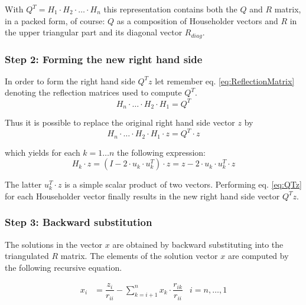 With $Q^T = H_1 \cdot H_2 \cdot \ldots \cdot H_n$ this representation
contains both the $Q$ and $R$ matrix, in a packed form, of course: $Q$
as a composition of Householder vectors and $R$ in the upper
triangular part and its diagonal vector $R_{diag}$.

\subsubsection{Step 2: Forming the new right hand side}

In order to form the right hand side $Q^T z$ let remember
eq. \eqref{eq:ReflectionMatrix} denoting the reflection matrices used
to compute $Q^T$.
\begin{equation}
H_n\cdot \ldots \cdot H_2\cdot H_1 = Q^T
\end{equation}

Thus it is possible to replace the original right hand side vector $z$
by
\begin{equation}
H_n\cdot \ldots \cdot H_2\cdot H_1\cdot z = Q^T \cdot z
\end{equation}

which yields for each $k = 1\ldots n$ the following expression:
\begin{equation}
\label{eq:QTz}
H_k \cdot z = \left(I - 2\cdot u_k \cdot u_k^T\right)\cdot z = z - 2\cdot u_k \cdot u_k^T\cdot z
\end{equation}

The latter $u_k^T\cdot z$ is a simple scalar product of two vectors.
Performing eq. \eqref{eq:QTz} for each Householder vector finally
results in the new right hand side vector $Q^T z$.

\subsubsection{Step 3: Backward substitution}

The solutions in the vector $x$ are obtained by backward substituting
into the triangulated $R$ matrix.  The elements of the solution vector
$x$ are computed by the following recursive equation.

\begin{align}
x_{i} &= \dfrac{z_{i}}{r_{ii}} - \sum_{k=i+1}^{n} x_{k}\cdot \dfrac{r_{ik}}{r_{ii}} & i = n,\ldots,1
\end{align}

